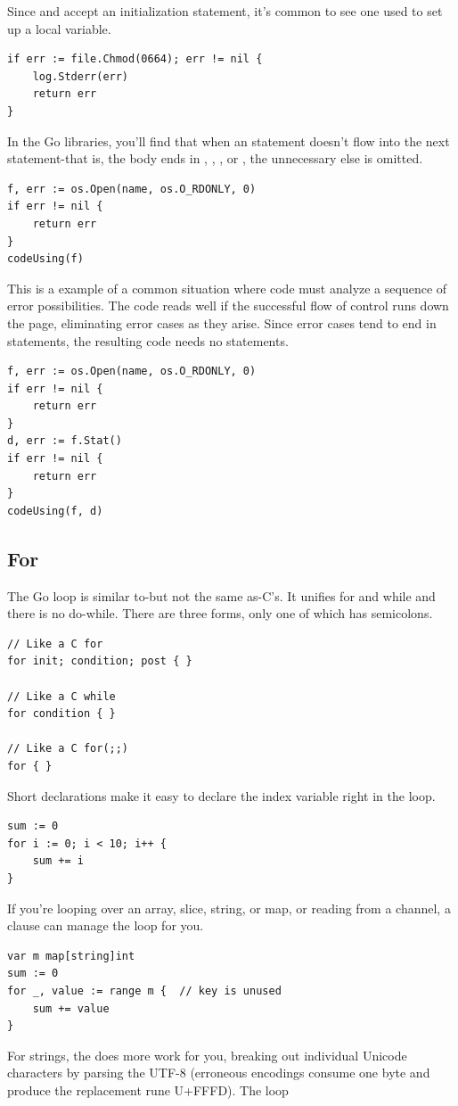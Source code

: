 Since  and  accept an initialization statement, it's common to
see one used to set up a local variable.

\begin{lstlisting}
if err := file.Chmod(0664); err != nil {
    log.Stderr(err)
    return err
}
\end{lstlisting}
In the Go libraries, you'll find that when an  statement doesn't flow
into the next statement-that is, the body ends in ,
, ,
or , the unnecessary else is omitted.

\begin{lstlisting}
f, err := os.Open(name, os.O_RDONLY, 0)
if err != nil {
    return err
}
codeUsing(f)
\end{lstlisting}
This is a example of a common situation where code must analyze a
sequence of error possibilities. The code reads well if the successful
flow of control runs down the page, eliminating error cases as they
arise. Since error cases tend to end in  statements, the resulting
code needs no  statements.
\begin{lstlisting}
f, err := os.Open(name, os.O_RDONLY, 0)
if err != nil {
    return err
}
d, err := f.Stat()
if err != nil {
    return err
}
codeUsing(f, d)
\end{lstlisting}

\subsection{For}
The Go  loop is similar to-but not the same as-C's. It unifies for
and while and there is no do-while. There are three forms, only one of
which has semicolons.
\begin{lstlisting}
// Like a C for
for init; condition; post { }

// Like a C while
for condition { }

// Like a C for(;;)
for { }
\end{lstlisting}
Short declarations make it easy to declare the index variable right in the loop.
\begin{lstlisting}
sum := 0
for i := 0; i < 10; i++ {
    sum += i
}
\end{lstlisting}
If you're looping over an array, slice, string, or map, or reading from
a channel, a  clause can manage the loop for you.
\begin{lstlisting}
var m map[string]int
sum := 0
for _, value := range m {  // key is unused
    sum += value
}
\end{lstlisting}
For strings, the  does more work for you, breaking out individual
Unicode characters by parsing the UTF-8 (erroneous encodings consume one
byte and produce the replacement rune U+FFFD). The loop

